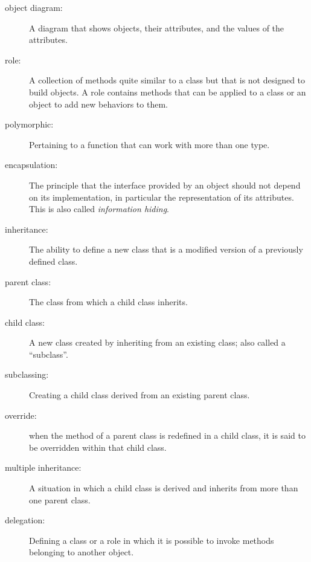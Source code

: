 \begin{description}
\item[object diagram:] A diagram that shows objects, their
attributes, and the values of the attributes.

\item[role:] A collection of methods quite similar to a class but 
that is not designed to build objects. A role contains methods 
that can be applied to a class or an object to add new behaviors 
to them.

\item[polymorphic:] Pertaining to a function that can work with more
  than one type.  

\item[encapsulation:] The principle that the interface provided 
by an object should not depend on its implementation, in particular
the representation of its attributes. This is also called 
\emph{information hiding}.

\item[inheritance:] The ability to define a new class that is a
modified version of a previously defined class.

\item[parent class:] The class from which a child class inherits.

\item[child class:] A new class created by inheriting from an
existing class; also called a ``subclass''.

\item[subclassing:] Creating a child class derived from an 
existing parent class.

\item[override:] when the method of a parent class is 
redefined in a child class, it is said to be overridden 
within that child class.

\item[multiple inheritance:] A situation in which a child class 
is derived and inherits from more than one parent class.

\item[delegation:] Defining a class or a role in which it is 
possible to invoke methods belonging to another object.

\end{description}

